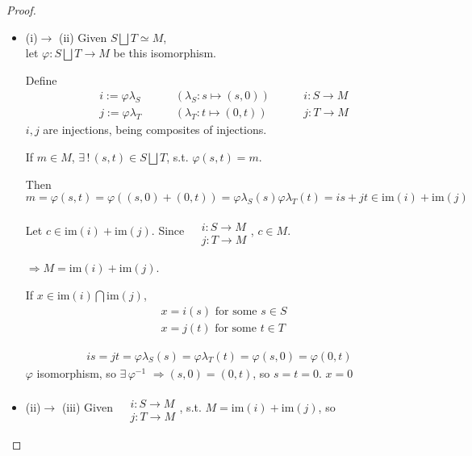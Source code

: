 \documentclass[10pt]{amsart}
\begin{document}
\begin{multicols*}{2}
\begin{proof}
\begin{itemize}
\item (i)$\to$ (ii)  Given $S \bigsqcup T \simeq  M$,  \\ 
 let $\varphi : S \bigsqcup T \to   M$ be this isomorphism.  

Define
\[
\begin{aligned}
	& i:= \varphi \lambda_S \qquad \, & (\lambda_S : s\mapsto (s,0)) \qquad \, & i :S \to M \\ 
	& j:= \varphi \lambda_T \qquad \, & (\lambda_T : t\mapsto (0,t)) \qquad \, & j :T \to M 
\end{aligned}
\]
$i,j$ are injections, being composites of injections.  

If $m\in M$, $\exists \, ! \, (s,t) \in S\bigsqcup T$, s.t. $\varphi(s,t)=m$.  

Then 
\[
m = \varphi(s,t) = \varphi((s,0) + (0,t)) = \varphi\lambda_S(s)  \varphi \lambda_T(t) = is + jt \in \text{im}(i) + \text{im}(j)
\]

Let $c\in \text{im}(i) + \text{im}(j)$.  Since $\begin{aligned}  & \quad \\ 
	& i : S\to M \\
& j : T \to M \end{aligned}$, $c\in M$.  

$\Longrightarrow M = \text{im}(i) + \text{im}(j)$.  



If $x\in \text{im}(i) \bigcap \text{im}(j)$, 
\[
\begin{aligned}
	& x = i(s) \text{ for some } s\in S \\ 
		& x = j(t) \text{ for some } t\in T  
\end{aligned}
\]

\[
\begin{gathered}
	is=jt = \varphi \lambda_S(s) = \varphi \lambda_T(t) = \varphi(s,0) = \varphi(0,t) 
\end{gathered}
\]
$\varphi$ isomorphism, so $\exists \, \varphi^{-1}$ $\Longrightarrow (s,0) = (0,t)$, so $s=t=0$.  $x=0$  
\item (ii)$\to $ (iii) Given $\begin{aligned} & \quad \\ & i:S\to M \\ & j:T\to M \end{aligned}$, s.t. $M= \text{im}(i) + \text{im}(j)$, so \\


\end{itemize}
\end{proof}
\end{multicols*}
\end{document}
